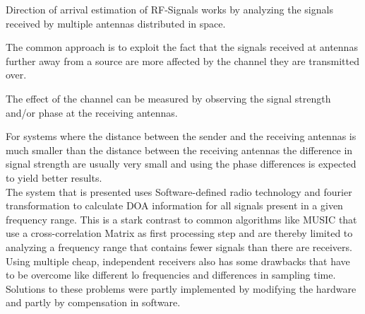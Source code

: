 Direction of arrival estimation of RF-Signals
works by analyzing the signals received by
multiple antennas distributed in space.

The common approach is to exploit the fact
that the signals received at antennas further
away from a source are more affected by the channel
they are transmitted over.

The effect of the channel can be measured by
observing the signal strength and/or phase
at the receiving antennas.

For systems where the distance between
the sender and the receiving antennas is much
smaller than the distance between the receiving
antennas the difference in signal strength
are usually very small and using the phase
differences is expected to yield better results. \\

The system that is presented uses Software-defined radio
technology and fourier transformation to calculate DOA
information for all signals present in a given frequency range.
This is a stark contrast to common algorithms like
MUSIC that use a cross-correlation Matrix as first
processing step and are thereby limited to analyzing
a frequency range that contains fewer signals than there
are receivers. \\

Using multiple cheap, independent receivers also
has some drawbacks that have to be overcome like
different lo frequencies and differences in sampling
time. Solutions to these problems were partly implemented
by modifying the hardware and partly by compensation
in software.
